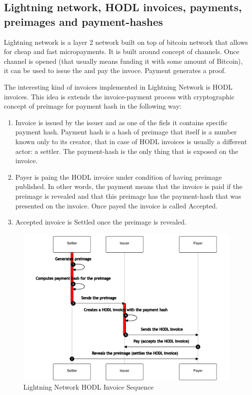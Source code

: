 \documentclass{article}
\begin{document}
\subsection{Lightning network, HODL invoices, payments, preimages and payment-hashes}

Lightning network is a layer 2 network built on top of bitcoin network that allows for cheap and fast micropayments.
It is built around concept of channels. Once channel is opened (that usually means funding it with some amount of Bitcoin), it can be used to issue the and pay the invoce. Payment generates a proof. 

The interesting kind of invoices implemented in Lightning Network is HODL invoices. This idea is extends the invoice-payment process with cryptographic concept of preimage for payment hash in the following way:
\begin{enumerate}
	\item Invoice is issued by the issuer and as one of the fiels it contains specific payment hash. Payment hash is a hash of preimage that itself is a number known only to its creator, that in case of HODL invoices is usually a different actor: a settler. The payment-hash is the only thing that is exposed on the invoice.
	\item Payer is paing the HODL invoice under condition of having preimage published. In other words, the payment means that the invoice is paid if the preimage is revealed and that this preimage has the payment-hash that was presented on the invoice. Once payed the invoice is called Accepted.
	\item Accepted invoice is Settled once the preimage is revealed.
\end{enumerate}


\begin{figure}
	\centering
	\includegraphics[scale=0.6]{LNDSequence.pdf}
	\caption{Lightning Network HODL Invoice Sequence}
	\label{fig:fr:lndsequence}
\end{figure}
\end{document}
